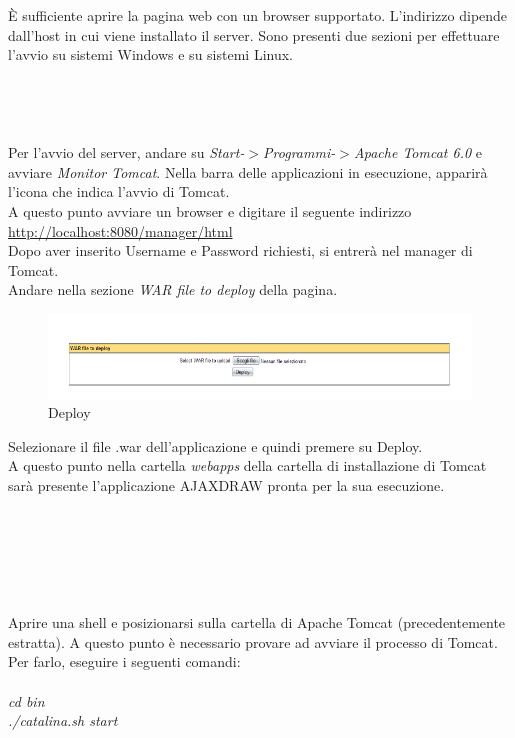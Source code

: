 \`E sufficiente aprire la pagina web con un browser supportato. L'indirizzo dipende dall'host in cui viene installato il server.
Sono presenti due sezioni per effettuare l'avvio su sistemi Windows e su sistemi Linux.\\
\\\\
\\
\\
Per l'avvio del server, andare su \textit{Start-$ > $Programmi-$ > $Apache Tomcat 6.0} e avviare \textit{Monitor Tomcat}.
Nella barra delle applicazioni in esecuzione, apparir\`a l'icona che indica l'avvio di Tomcat.\\
A questo punto avviare un browser e digitare il seguente indirizzo\\ \href{http://localhost:8080/manager/html}{http://localhost:8080/manager/html}\\
Dopo aver inserito Username e Password richiesti, si entrer\`a nel manager di Tomcat.\\
Andare nella sezione \textit{WAR file to deploy} della pagina.\\

\begin{figure}[!ht]
\centering
\includegraphics[scale=0.7]{images/DeployTomcat.png}
\caption{Deploy}
\end{figure} 

Selezionare il file .war dell'applicazione e quindi premere su Deploy.\\
A questo punto nella cartella \textit{webapps} della cartella di installazione di Tomcat sar\`a presente l'applicazione AJAXDRAW pronta per la sua esecuzione.\\
\\\\
\\\\
\\
\\
Aprire una shell e posizionarsi sulla cartella di Apache Tomcat (precedentemente estratta).
A questo punto \`e necessario provare ad avviare il processo di Tomcat. Per farlo, eseguire i seguenti comandi:\\
\\
\textit{cd bin}\\
\textit{./catalina.sh start}\\

